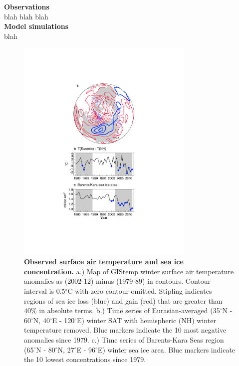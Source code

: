 \documentclass{nature}
\begin{document}
\begin{methods}
\textbf{Observations} \\
blah blah blah
\\
\textbf{Model simulations}\\
blah
\end{methods}

\begin{figure}%
\centering
\noindent\includegraphics[width=20pc]{Word/Figure_1.pdf}
\caption{\textbf{Observed surface air temperature and sea ice concentration.} a.) Map of GIStemp winter surface air temperature anomalies as (2002-12) minus (1979-89) in contours. Contour interval is 0.5$^\circ$C with zero contour omitted. Stipling indicates regions of sea ice loss (blue) and gain (red) that are greater than 40\% in absolute terms. b.) Time series of Eurasian-averaged (35$^\circ$N - 60$^\circ$N, 40$^\circ$E - 120$^\circ$E) winter SAT with hemispheric (NH) winter temperature removed. Blue markers indicate the 10 most negative anomalies since 1979. c.) Time series of Barents-Kara Seas region (65$^\circ$N - 80$^\circ$N, 27$^\circ$E - 96$^\circ$E) winter sea ice area. Blue markers indicate the 10 lowest concentrations since 1979.
}
\label{fig:fig1} 
\end{figure}
\end{document}
